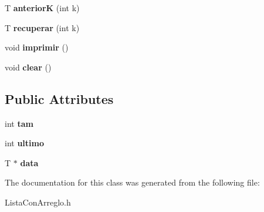 \begin{DoxyCompactItemize}
\item 
T {\bfseries anteriorK} (int k)\hypertarget{class_lista_con_arreglo_ad32acb0a906dafff65201dbb506b48f7}{}\label{class_lista_con_arreglo_ad32acb0a906dafff65201dbb506b48f7}

\item 
T {\bfseries recuperar} (int k)\hypertarget{class_lista_con_arreglo_af880c9a6795cf9281f2a217d0a4b0c07}{}\label{class_lista_con_arreglo_af880c9a6795cf9281f2a217d0a4b0c07}

\item 
void {\bfseries imprimir} ()\hypertarget{class_lista_con_arreglo_aa8267cef7510ef79626a812b3c85505d}{}\label{class_lista_con_arreglo_aa8267cef7510ef79626a812b3c85505d}

\item 
void {\bfseries clear} ()\hypertarget{class_lista_con_arreglo_a6d13ed44254b135bdbd88286a6c98be1}{}\label{class_lista_con_arreglo_a6d13ed44254b135bdbd88286a6c98be1}

\end{DoxyCompactItemize}
\subsection*{Public Attributes}
\begin{DoxyCompactItemize}
\item 
int {\bfseries tam}\hypertarget{class_lista_con_arreglo_a7b1a9c6334db75f4ffb023a95b01e3f4}{}\label{class_lista_con_arreglo_a7b1a9c6334db75f4ffb023a95b01e3f4}

\item 
int {\bfseries ultimo}\hypertarget{class_lista_con_arreglo_a41f052fbde3598cb6f7ec7d8412be8c3}{}\label{class_lista_con_arreglo_a41f052fbde3598cb6f7ec7d8412be8c3}

\item 
T $\ast$ {\bfseries data}\hypertarget{class_lista_con_arreglo_af5771ddbfd5f2fbd5925cb5bae26908e}{}\label{class_lista_con_arreglo_af5771ddbfd5f2fbd5925cb5bae26908e}

\end{DoxyCompactItemize}


The documentation for this class was generated from the following file\+:\begin{DoxyCompactItemize}
\item 
Lista\+Con\+Arreglo.\+h\end{DoxyCompactItemize}
